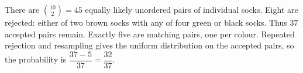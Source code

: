 There are $\binom{10}{2}=45$ equally likely unordered pairs of individual socks. Eight are rejected: either of two brown socks with any of four green or black socks. Thus $37$ accepted pairs remain. Exactly five are matching pairs, one per colour. Repeated rejection and resampling gives the uniform distribution on the accepted pairs, so the probability is $\boxed{\dfrac{37-5}{37}=\dfrac{32}{37}}$.
